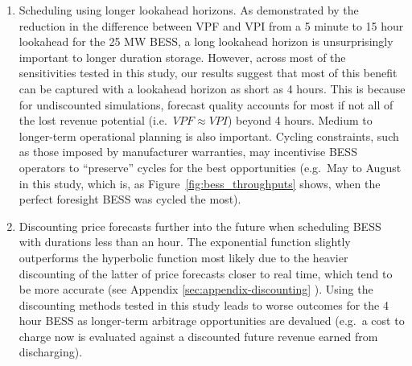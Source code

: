\documentclass[12pt,a4paper,]{report}
\begin{document}
\begin{enumerate}
\def\labelenumi{\arabic{enumi}.}
\item
  Scheduling using longer lookahead horizons. As demonstrated by the
  reduction in the difference between VPF and VPI from a 5 minute to 15
  hour lookahead for the 25 MW BESS, a long lookahead horizon is
  unsurprisingly important to longer duration storage. However, across
  most of the sensitivities tested in this study, our results suggest
  that most of this benefit can be captured with a lookahead horizon as
  short as 4 hours. This is because for undiscounted simulations,
  forecast quality accounts for most if not all of the lost revenue
  potential (i.e.~\(VPF \approx VPI\)) beyond 4 hours. Medium to
  longer-term operational planning is also important. Cycling
  constraints, such as those imposed by manufacturer warranties, may
  incentivise BESS operators to ``preserve'' cycles for the best
  opportunities (e.g.~May to August in this study, which is, as
  Figure~\ref{fig:bess_throughputs} shows, when the perfect foresight
  BESS was cycled the most).
\item
  Discounting price forecasts further into the future when scheduling
  BESS with durations less than an hour. The exponential function
  slightly outperforms the hyperbolic function most likely due to the
  heavier discounting of the latter of price forecasts closer to real
  time, which tend to be more accurate (see Appendix
  \ref{sec:appendix-discounting} ). Using the discounting methods tested
  in this study leads to worse outcomes for the 4 hour BESS as
  longer-term arbitrage opportunities are devalued (e.g.~a cost to
  charge now is evaluated against a discounted future revenue earned
  from discharging).
\end{enumerate}
\end{document}
